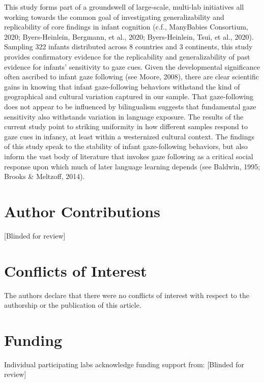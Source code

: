 \documentclass[,man,floatsintext]{apa6}
\begin{document}
This study forms part of a groundswell of large-scale, multi-lab initiatives all working towards the common goal of investigating generalizability and replicability of core findings in infant cognition (c.f., ManyBabies Consortium, 2020; Byers-Heinlein, Bergmann, et al., 2020; Byers-Heinlein, Tsui, et al., 2020). Sampling 322 infants distributed across 8 countries and 3 continents, this study provides confirmatory evidence for the replicability and generalizability of past evidence for infants' sensitivity to gaze cues. Given the developmental significance often ascribed to infant gaze following (see Moore, 2008), there are clear scientific gains in knowing that infant gaze-following behaviors withstand the kind of geographical and cultural variation captured in our sample. That gaze-following does not appear to be influenced by bilingualism suggests that fundamental gaze sensitivity also withstands variation in language exposure. The results of the current study point to striking uniformity in how different samples respond to gaze cues in infancy, at least within a westernized cultural context. The findings of this study speak to the stability of infant gaze-following behaviors, but also inform the vast body of literature that invokes gaze following as a critical social response upon which much of later language learning depends (see Baldwin, 1995; Brooks \& Meltzoff, 2014).

\hypertarget{author-contributions}{%
\section{Author Contributions}\label{author-contributions}}

{[}Blinded for review{]}

\hypertarget{conflicts-of-interest}{%
\section{Conflicts of Interest}\label{conflicts-of-interest}}

The authors declare that there were no conflicts of interest with respect to the authorship or the publication of this article.

\hypertarget{funding}{%
\section{Funding}\label{funding}}

Individual participating labs acknowledge funding support from: {[}Blinded for review{]}
\end{document}
